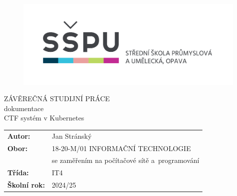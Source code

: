 \documentclass[12pt, a4paper,
oneside,      %
openright
]{report}
\title{\nazevPrace} %
\author{\jmenoAutora} %
\date{\datumOdevzdani} %
\newcommand\obor{INFORMAČNÍ TECHNOLOGIE} %
\newcommand\kodOboru{18-20-M/01} %
\newcommand\zamereni{se zaměřením na počítačové sítě a~programování} %
\newcommand\trida{IT4} %
\newcommand\jmenoAutora{Jan Stránský}  %
\newcommand\skolniRok{2024/25} %
\newcommand\nazevPrace{CTF systém v Kubernetes} %
\begin{document}
	
	\pagestyle{empty}
	
	\cleardoublepage

	
	{\selectfont
		\begin{figure}[h]
			\centering
			\includegraphics[width=0.6\linewidth]{image/logo-skoly.png} 
		\end{figure}
		
		
		{\bfseries %
			\begin{center}
				\vspace{0.025 \textheight}
				\LARGE{ZÁVĚREČNÁ STUDIJNÍ PRÁCE}\\
				\large{dokumentace}\\
				\vspace{0.075 \textheight}
				\LARGE {\nazevPrace}\\
			\end{center}  
		}%
		
		
		\vspace{0.02 \textheight}
		\begin{table}[h!]
			\begin{tabular}{ll}
				\textbf{Autor:} & \jmenoAutora\\ 
				\textbf{Obor:} & \kodOboru { } \obor\\
				\textbf{} & \zamereni\\
				\textbf{Třída:} & \trida\\
				\textbf{Školní rok:} & \skolniRok\\
			\end{tabular}
			
		\end{table}		
	}
	
\cleardoublepage %
	
\end{document}
